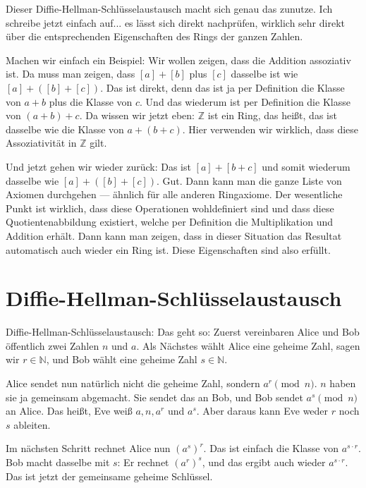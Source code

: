 \begin{spoken-clean}[00:22:30 - 00:24:54]
Dieser Diffie-Hellman-Schlüsselaustausch macht sich genau das zunutze.  Ich schreibe jetzt einfach auf... es lässt sich direkt nachprüfen, wirklich sehr direkt über die entsprechenden Eigenschaften des Rings der ganzen Zahlen.

Machen wir einfach ein Beispiel: Wir wollen zeigen, dass die Addition assoziativ ist. Da muss man zeigen, dass $[a] + [b]$ plus $[c]$ dasselbe ist wie $[a] + ([b] + [c])$. Das ist direkt, denn das ist ja per Definition die Klasse von $a + b$ plus die Klasse von $c$. Und das wiederum ist per Definition die Klasse von $(a + b) + c$. Da wissen wir jetzt eben: $\mathbb{Z}$ ist ein Ring, das heißt, das ist dasselbe wie die Klasse von $a + (b + c)$. Hier verwenden wir wirklich, dass diese Assoziativität in $\mathbb{Z}$ gilt.

Und jetzt gehen wir wieder zurück: Das ist $[a] + [b + c]$ und somit wiederum dasselbe wie $[a] + ([b] + [c])$. Gut. Dann kann man die ganze Liste von Axiomen durchgehen --- ähnlich für alle anderen Ringaxiome. Der wesentliche Punkt ist wirklich, dass diese Operationen wohldefiniert sind und dass diese Quotientenabbildung existiert, welche per Definition die Multiplikation und Addition erhält. Dann kann man zeigen, dass in dieser Situation das Resultat automatisch auch wieder ein Ring ist. Diese Eigenschaften sind also erfüllt.
\end{spoken-clean}

\section{Diffie-Hellman-Schlüsselaustausch}

\begin{spoken-clean}[00:24:54 - 00:26:59]
Diffie-Hellman-Schlüsselaustausch: Das geht so: Zuerst vereinbaren Alice und Bob öffentlich zwei Zahlen $n$ und $a$. Als Nächstes wählt Alice eine geheime Zahl, sagen wir $r \in \mathbb{N}$, und Bob wählt eine geheime Zahl $s \in \mathbb{N}$.

Alice sendet nun natürlich nicht die geheime Zahl, sondern $a^r \pmod n$. $n$ haben sie ja gemeinsam abgemacht. Sie sendet das an Bob, und Bob sendet $a^s \pmod n$ an Alice. Das heißt, Eve weiß $a, n, a^r$ und $a^s$. Aber daraus kann Eve weder $r$ noch $s$ ableiten.

Im nächsten Schritt rechnet Alice nun $(a^s)^r$. Das ist einfach die Klasse von $a^{s \cdot r}$. Bob macht dasselbe mit $s$: Er rechnet $(a^r)^s$, und das ergibt auch wieder $a^{s \cdot r}$. Das ist jetzt der gemeinsame geheime Schlüssel.
\end{spoken-clean}

